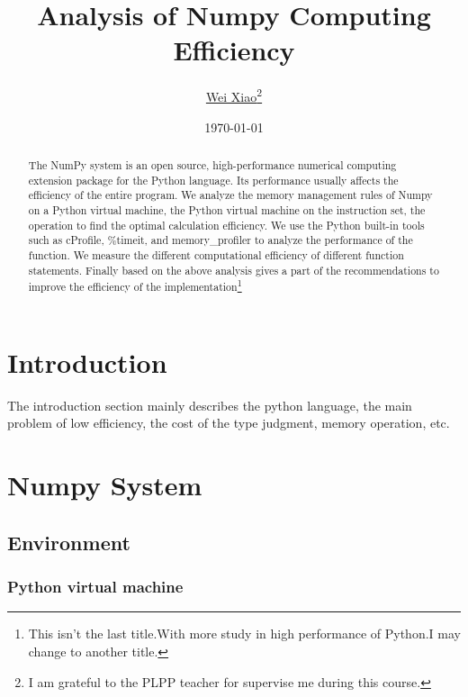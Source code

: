 \documentclass[12pt,a4paper]{article}
\begin{document}
\title{Analysis of Numpy Computing Efficiency}

\author{\href{http://awy.ink/contact}{Wei Xiao}\thanks{I am grateful to the PLPP teacher for supervise me during this course.}}

\date{\small \today}

\maketitle

\begin{abstract}

The NumPy system is an open source, high-performance numerical computing extension package for the Python language.
 Its performance usually affects the efficiency of the entire program. 
 We analyze the memory management rules of Numpy on a Python virtual machine, the Python virtual machine on the instruction set, the operation to find the optimal calculation efficiency.
We use the Python built-in tools such as cProfile, \%timeit, and memory\_profiler to analyze the performance of the function. We measure the different computational efficiency of different function statements.
Finally based on the above analysis gives a part of the recommendations to improve the efficiency of the implementation\footnote{This isn't the last title.With more study in high performance of Python.I may change to another title.}
\end{abstract}

\newpage

\section{Introduction}
The introduction section mainly describes the python language, the main problem of low efficiency, the cost of the type judgment, memory operation, etc.

\section{Numpy System}

\subsection{Environment}

\subsubsection{Python virtual machine}
\end{document}
